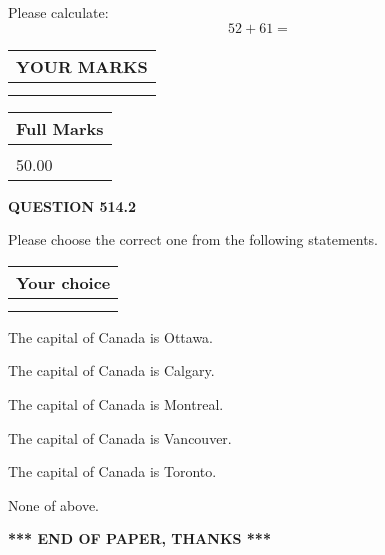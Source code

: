 \documentclass[12pt]{article}
\begin{document}
  
 
Please calculate:
\begin{equation}
52 +  %
61 = \nonumber
\end{equation}
 

 

 
  
\vspace{0.2in}
  
\noindent\begin{tabular}{|l|}
\hline
 YOUR MARKS  \\
\hline
 \\ 
 \\ 
\hline
\end{tabular}
\hspace{0.05in} \begin{tabular}{|l|}
\hline
 Full Marks  \\
\hline
 \\ 
50.00 \\
\hline
\end{tabular}
{\textbf{\Large{QUESTION
514.2 
}}}
  
  
Please choose the correct one from the following statements.
  
  
\noindent\hspace{3.0in} \begin{tabular}{|l|}
\hline
Your choice \\
\hline
 \\ 
 \\ 
\hline
\end{tabular}
  
  
 
 
The capital of Canada is Ottawa.
 
 
The capital of Canada is Calgary.
 
 
The capital of Canada is Montreal.
 
 
The capital of Canada is Vancouver.
 
 
The capital of Canada is Toronto.
 
 
 None of above.
 
 
   
   
 \vspace{0.2in}
 
   
   
   
   
\vspace{1.0in} 
{\textbf{\large{ *** END OF PAPER, THANKS *** }}} 
   
\end{document}
